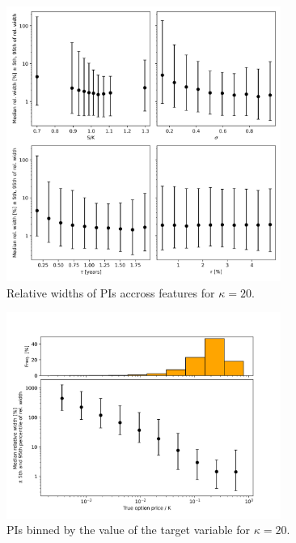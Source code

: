\documentclass{article}
\theoremstyle{definition}
\begin{document}
\begin{figure}
\centering
\includegraphics[width=0.8\textwidth]{reports/figures/simulated_data/sim_kappa20_rel_widths_to_features.png}
\caption{Relative widths of PIs accross features for $\kappa=20$.}
\end{figure}

\begin{figure}
\centering
\includegraphics[width=0.8\textwidth]{reports/figures/simulated_data/sim_kappa20_rel_widths_to_opt_price.png}
\caption{PIs binned by the value of the target variable for $\kappa=20$.}
\end{figure}

\end{document}
